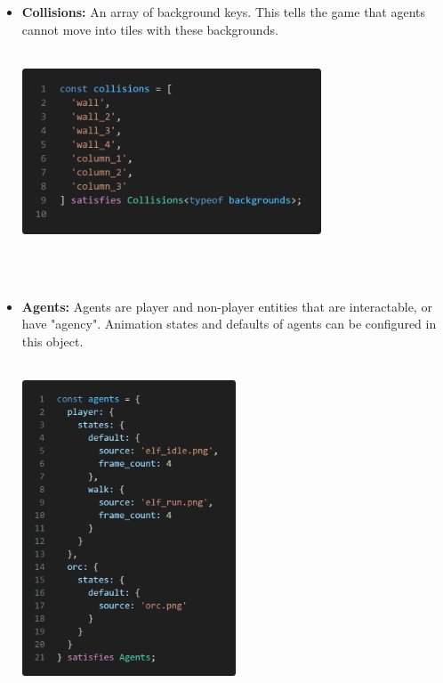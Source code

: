 \documentclass{article}
\begin{document}
\begin{itemize}
    \item \textbf{Collisions:} An array of background keys. This tells the game that agents cannot move into tiles with these backgrounds.\\\\
    \begin{minipage}{\linewidth}
        \centering
        \includegraphics[width=0.7\textwidth]{collisions.png}
    \end{minipage}\\\\
    
    \item \textbf{Agents:} Agents are player and non-player entities that are interactable, or have "agency". Animation states and defaults of agents can be configured in this object.\\\\
    \begin{minipage}{\linewidth}
        \centering
        \includegraphics[width=0.5\textwidth]{agents.png}
    \end{minipage}\\\\
    

\end{itemize}
\end{document}

